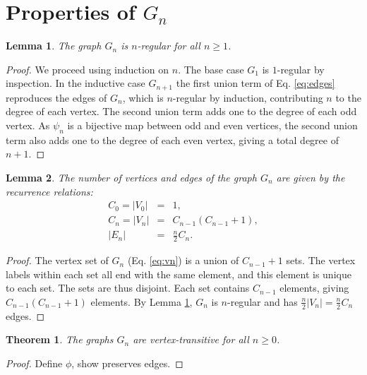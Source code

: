\documentclass{article}
\newcommand{\beq}{\begin{eqnarray}}
\newcommand{\eeq}{\end{eqnarray}}
\newtheorem{lemma}{Lemma}
\newtheorem{theorem}{Theorem}
\begin{document}
\section{Properties of $G_n$}

\begin{lemma}
\label{lem:regular}
The graph $G_n$ is $n$-regular for all $n \geq 1$.
\end{lemma}
\begin{proof}
We proceed using induction on $n$.
The base case $G_1$ is $1$-regular by inspection.
In the inductive case $G_{n+1}$
the first union term of Eq. \ref{eq:edges}
reproduces the edges of $G_n$,
which is $n$-regular by induction,
contributing $n$ to the degree of each vertex.
The second union term adds one to the degree of each odd vertex.
As $\psi_n$ is a bijective map between odd and even vertices,
the second union term also adds one to the degree of each even vertex,
giving a total degree of $n + 1$.
\end{proof}

\begin{lemma}
The number of vertices and edges of the graph $G_n$ are given by the recurrence
relations:
\beq
C_0 = |V_0| &=& 1, \\
\label{eq:cnrec}C_{n} = |V_{n}| &=& C_{n-1} (C_{n-1} + 1), \\
|E_n| &=& \frac{n}{2} C_n.
\eeq
\end{lemma}
\begin{proof}
The vertex set of $G_n$ (Eq. \ref{eq:vn}) is a union of
$C_{n-1} + 1$ sets.
The vertex labels within each set all end with the same element,
and this element is unique to each set.
The sets are thus disjoint.
Each set contains $C_{n-1}$ elements, giving $C_{n-1}(C_{n-1} + 1)$
elements.
By Lemma \ref{lem:regular}, $G_n$ is $n$-regular and has
$\frac{n}{2}|V_n| = \frac{n}{2}C_n$ edges.
\end{proof}
\begin{theorem}
The graphs $G_n$ are vertex-transitive for all $n \geq 0$.
\end{theorem}
\begin{proof}
Define $\phi$, show preserves edges.
\end{proof}



\end{document}
